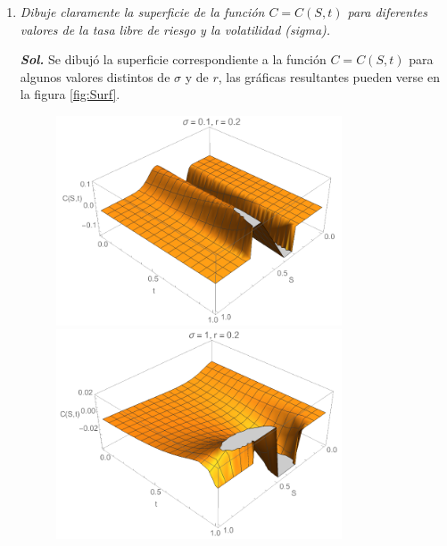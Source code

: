 \documentclass[letter]{article}
\begin{document}
\begin{enumerate}
\begin{enumerate}[label=\alph*)]
\item \emph{Dibuje claramente la superficie de la función $C = C(S,t)$ para diferentes valores de la tasa libre de riesgo y la volatilidad (sigma).}

\medskip

\textbf{\textit{Sol.}} Se dibujó la superficie correspondiente a la función $C = C(S,t)$ para algunos valores distintos de $\sigma$ y de $r$, las gráficas resultantes pueden verse en la figura \ref{fig:Surf}.

\begin{figure}[h!]
\centering
\begin{minipage}{0.49\textwidth}
\includegraphics[width=0.8\textwidth]{surf1.pdf}
\end{minipage}
\begin{minipage}{0.49\textwidth}
\includegraphics[width=0.8\textwidth]{surf2.pdf}
\end{minipage}
\begin{minipage}{0.49\textwidth}

\end{minipage}
\end{figure}
\end{enumerate}
\end{enumerate}
\end{document}
